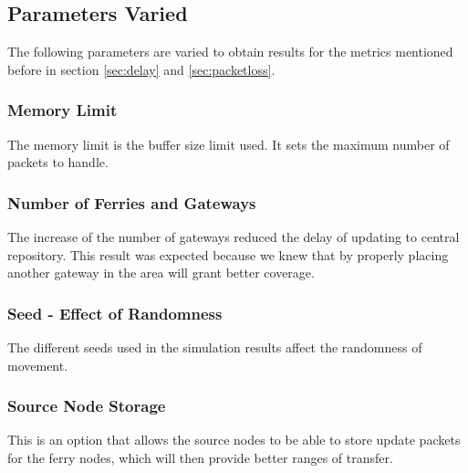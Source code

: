 \subsection{Parameters Varied} %
The following parameters are varied to obtain results for the metrics mentioned before in section \ref{sec:delay} and \ref{sec:packetloss}.
  
\subsubsection{Memory Limit}
The memory limit is the buffer size limit used.
It sets the maximum number of packets to handle.  

\subsubsection{Number of Ferries and Gateways}
The increase of the number of gateways reduced the delay of updating to central repository.  
This result was expected because we knew that by properly placing another gateway in the area will grant better coverage.  

\subsubsection{Seed - Effect of Randomness}
The different seeds used in the simulation results affect the randomness of movement.  

\subsubsection{Source Node Storage}
\label{sec:source_node_storage}
This is an option that allows the source nodes to be able to store update packets for the ferry nodes, which will then provide better ranges of transfer.
